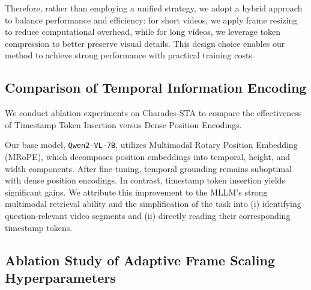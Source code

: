 Therefore, rather than employing a unified strategy, we adopt a hybrid approach to balance performance and efficiency: for short videos, we apply frame resizing to reduce computational overhead, while for long videos, we leverage token compression to better preserve visual details. This design choice enables our method to achieve strong performance with practical training costs.

\subsection{Comparison of Temporal Information Encoding}
\label{sub:temporal encoding}

We conduct ablation experiments on Charades-STA to compare the effectiveness of Timestamp Token Insertion versus Dense Position Encodings.

\begin{table}[h]
\caption{
\textbf{Ablation on temporal information encoding.}}
\vspace{3pt}
\centering
{}
\label{tab:ablation_encoding}
\end{table}

Our base model, \texttt{Qwen2-VL-7B}, utilizes Multimodal Rotary Position Embedding (MRoPE), which decomposes position embeddings into temporal, height, and width components. After fine-tuning, temporal grounding remains suboptimal with dense position encodings.
In contrast, timestamp token insertion yields significant gains. We attribute this improvement to the MLLM's strong multimodal retrieval ability and the simplification of the task into (i) identifying question-relevant video segments and (ii) directly reading their corresponding timestamp tokens.

\subsection{Ablation Study of Adaptive Frame Scaling Hyperparameters}
\label{sub:hyper}

